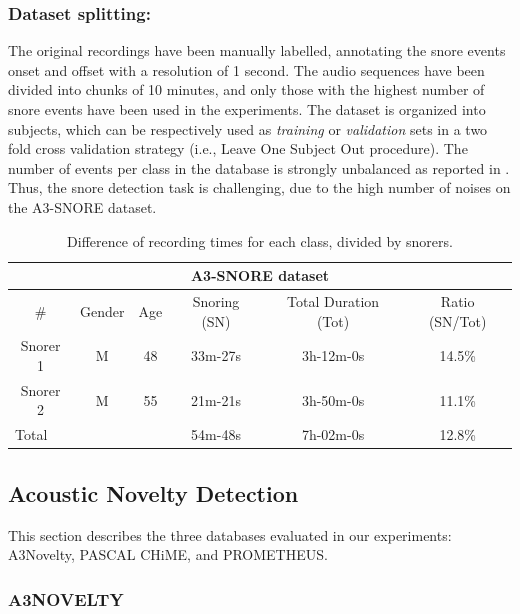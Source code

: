 \subsubsection{Dataset splitting:}
The original recordings have been manually labelled, annotating the snore events onset and offset with a resolution of 1 second. The audio sequences have been divided into chunks of 10 minutes, and only those with the highest number of snore events have been used in the experiments. 
The dataset is organized into subjects, which can be respectively used as \emph{training} or \emph{validation} sets in a two fold cross validation strategy (i.e., Leave One Subject Out procedure). The number of events per class in the database is strongly unbalanced as reported in . Thus, the snore detection task is challenging, due to the high number of noises on the A3-SNORE dataset. 

\begin{table}[ht]
	\centering
	\caption[A3-SNORE dataset]{Difference of recording times for each class, divided by snorers.}
	\begin{tabular}{cccccc}
		\hline
		\multicolumn{6}{c}{\textbf{A3-SNORE dataset}} \\
		\hline
		\# & Gender & Age & Snoring (SN) & Total Duration (Tot) & Ratio (SN/Tot) \\
		\hline
		Snorer 1 & M & 48 & 33m-27s & 3h-12m-0s & 14.5\% \\
		Snorer 2 & M & 55 & 21m-21s & 3h-50m-0s & 11.1\% \\
		\hline
		\multicolumn{3}{l}{Total} &	54m-48s	& 7h-02m-0s	& 12.8\%\\
		\hline    
	\end{tabular}	
	\label{a3snore} 
\end{table}

\subsection{Acoustic Novelty Detection}

\label{sec:databases}
This section describes the three databases evaluated in our experiments: A3Novelty, PASCAL CHiME, and PROMETHEUS.

\subsubsection{A3NOVELTY}


